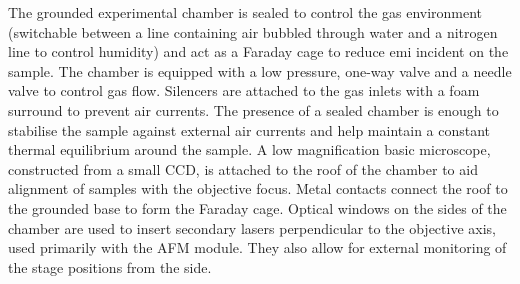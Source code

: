 \documentclass{article}
\begin{document}
The grounded experimental chamber is sealed to control the gas environment (switchable between a line containing air bubbled through water and a nitrogen line to control humidity) and act as a Faraday cage to reduce \gls{emi} incident on the sample. The chamber is equipped with a low pressure, one-way valve and a needle valve to control gas flow. Silencers are attached to the gas inlets with a foam surround to prevent air currents. The presence of a sealed chamber is enough to stabilise the sample against external air currents and help maintain a constant thermal equilibrium around the sample. A low magnification basic microscope, constructed from a small CCD, is attached to the roof of the chamber to aid alignment of samples with the objective focus. Metal contacts connect the roof to the grounded base to form the Faraday cage. Optical windows on the sides of the chamber are used to insert secondary lasers perpendicular to the objective axis, used primarily with the AFM module. They also allow for external monitoring of the stage positions from the side.

\FloatBarrier
\end{document}
